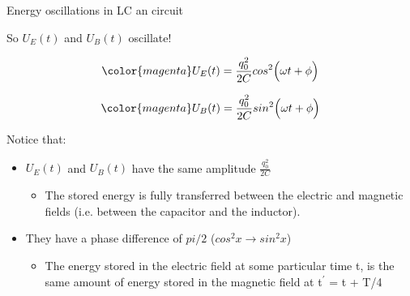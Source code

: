 \begin{frame}{Energy oscillations in LC an circuit}

So $U_E(t)$ and $U_B(t)$ oscillate!

\begin{equation*}
  {\color{magenta}
      U_E(t) = \frac{q_0^2}{2C} cos^{2}\Big( \omega t + \phi \Big)
 }
\end{equation*}

\begin{equation*}
  {\color{magenta}
      U_B(t) = \frac{q_0^2}{2C} sin^2\Big( \omega t + \phi \Big)
  }
\end{equation*}

Notice that:
\begin{itemize}
  \item $U_E(t)$ and $U_B(t)$ have the same amplitude $\displaystyle \frac{q_0^2}{2C}$
    \begin{itemize}
        \item The stored energy is fully transferred between the
                  electric and magnetic fields (i.e. between the capacitor and the inductor).
    \end{itemize}
  \item They have a phase difference of $pi/2$ ($cos^2x \rightarrow sin^2x$)
    \begin{itemize}
        \item The energy stored in the electric field at some particular time t,
                  is the same amount of energy stored in the magnetic field at t$^\prime$ = t + T/4
    \end{itemize}
\end{itemize}


\end{frame}

%
%
%

